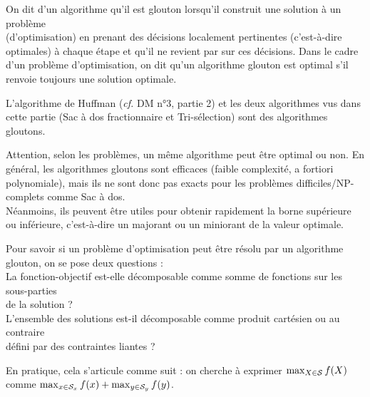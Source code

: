		\begin{Definition}
			On dit d'un algorithme qu'il est glouton lorsqu'il construit une solution à un problème \\ (d'optimisation) en prenant des décisions localement pertinentes (c'est-à-dire optimales) à chaque étape et qu'il ne revient par sur ces décisions.
				\nt
			Dans le cadre d'un problème d'optimisation, on dit qu'un algorithme glouton est optimal s'il renvoie toujours une solution optimale.
		\end{Definition}
		
		\begin{Exemples}
			L'algorithme de Huffman (\emph{cf.} DM n°3, partie 2) et les deux algorithmes vus dans cette partie (\textsf{{Sac à dos fractionnaire}} et \textsf{Tri-sélection}) sont des algorithmes gloutons.
		\end{Exemples}
		
		\begin{Remarque}
			Attention, selon les problèmes, un même algorithme peut être optimal ou non. En général, les algorithmes gloutons sont efficaces (faible complexité, a fortiori polynomiale), mais ils ne sont donc pas exacts pour les problèmes difficiles/NP-complets comme \textsf{{Sac à dos}}.
			\\[2mm]
		Néanmoins, ils peuvent être utiles pour obtenir rapidement la borne supérieure ou inférieure, c'est-à-dire un majorant ou un miniorant de la valeur optimale.
		\end{Remarque}
		
		\pagebreak
		\begin{Aretenir}
			Pour savoir si un problème d'optimisation peut être résolu par un algorithme glouton, on se pose deux questions : \\
				 \bdot La fonction-objectif est-elle décomposable comme somme de fonctions sur les sous-parties \\ \listskip de la solution ? \\
				 \bdot L'ensemble des solutions est-il décomposable comme produit cartésien ou au contraire \\ \listskip défini par des contraintes liantes ?
		\end{Aretenir}
		
		\begin{Remarque}
			En pratique, cela s'articule comme suit : on cherche à exprimer \(\max_{X\in\cal{S}} f(X)\) comme \(\max_{x\in \cal{S}_x} f(x) + \max_{y\in\cal{S}_y} f(y)\).
		\end{Remarque}
	
